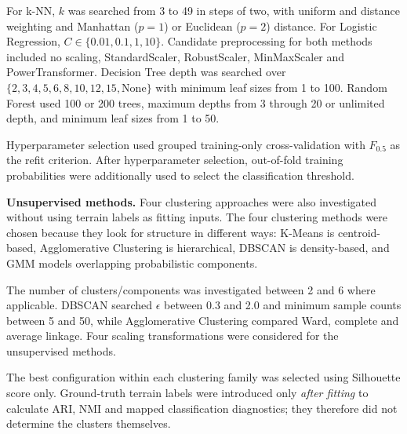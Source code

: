 For k-NN, $k$ was searched from 3 to 49 in steps of two, with uniform and
distance weighting and Manhattan ($p=1$) or Euclidean ($p=2$) distance.
For Logistic Regression, $C \in \{0.01,0.1,1,10\}$. Candidate preprocessing
for both methods included no scaling, StandardScaler, RobustScaler,
MinMaxScaler and PowerTransformer. Decision Tree depth was searched over
$\{2,3,4,5,6,8,10,12,15,\mathrm{None}\}$ with minimum leaf sizes from
1 to 100. Random Forest used 100 or 200 trees, maximum depths from 3 through
20 or unlimited depth, and minimum leaf sizes from 1 to 50.

Hyperparameter selection used grouped training-only cross-validation with
$F_{0.5}$ as the refit criterion. After hyperparameter selection,
out-of-fold training probabilities were additionally used to select the
classification threshold.

\textbf{Unsupervised methods.}
Four clustering approaches were also investigated without using terrain
labels as fitting inputs. The four clustering methods were chosen because they 
look for structure in different ways: K-Means is centroid-based, Agglomerative
Clustering is hierarchical, DBSCAN is density-based, and GMM models overlapping
probabilistic components.

The number of clusters/components was investigated between 2 and 6 where
applicable. DBSCAN searched $\epsilon$ between 0.3 and 2.0 and minimum sample
counts between 5 and 50, while Agglomerative Clustering compared Ward,
complete and average linkage. Four scaling transformations were considered
for the unsupervised methods.

The best configuration within each clustering family was selected using
Silhouette score only. Ground-truth terrain labels were introduced only
\emph{after fitting} to calculate ARI, NMI and mapped classification
diagnostics; they therefore did not determine the clusters themselves.

